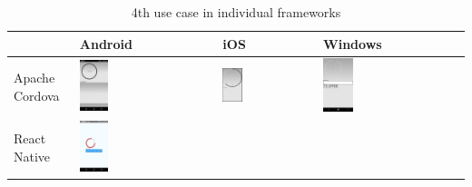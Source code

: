 \documentclass[english,master,public,dept460,male,cpdeclaration,oneside]{diploma}
\begin{document}
\begin{table}[!h]
	\centering
	\caption{4th use case in individual frameworks}
	\label{table:frameworks4}
	\begin{tabular}{p{3cm} | p{4cm} | p{4cm} | p{4cm} }
		\toprule			
		& Android & iOS & Windows \\
		\midrule
		Apache Cordova	
		& \includegraphics[width=0.22\textwidth]{Figures/cordova4android.PNG}
		& \includegraphics[width=0.22\textwidth]{Figures/cordova4ios.png}
		& \includegraphics[width=0.22\textwidth]{Figures/cordova4windows.PNG}
		\\
		\midrule
		React Native	
		& \includegraphics[width=0.22\textwidth]{Figures/react4android.PNG}

\end{tabular}
\end{table}
\end{document}
